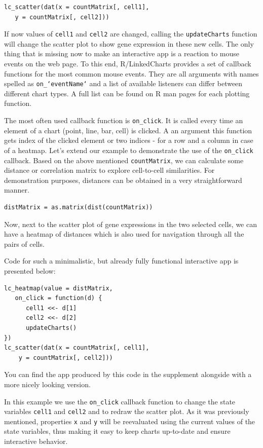 \documentclass[twocolumn,10pt]{article}
\begin{document}
\begin{verbatim}
lc_scatter(dat(x = countMatrix[, cell1], 
   y = countMatrix[, cell2]))
\end{verbatim}

If now values of \texttt{cell1} and \texttt{cell2} are changed, calling the \texttt{updateCharts} function will change the scatter plot to show gene expression in these new cells. The only thing that is missing now to make an interactive app is a reaction to mouse events on the web page. To this end, R/LinkedCharts provides a set of callback functions for the most common mouse events. They are all arguments with names spelled as \texttt{on_`eventName`} and a list of available listeners can differ between different chart types. A full list can be found on R man pages for each plotting function.

The most often used callback function is \texttt{on_click}. It is called every time an element of a chart (point, line, bar, cell) is clicked. A an argument this function gets index of the clicked element or two indices - for a row and a column in case of a heatmap. Let's extend our example to demonstrate the use of the \texttt{on_click} callback. Based on the above mentioned \texttt{countMatrix}, we can calculate some distance or correlation matrix to explore cell-to-cell similarities. For demonstration purposes, distances can be obtained in a very straightforward manner.

\begin{verbatim}
distMatrix = as.matrix(dist(countMatrix))
\end{verbatim}

Now, next to the scatter plot of gene expressions in the two selected cells, we can have a heatmap of distances which is also used for navigation through all the pairs of cells. 

Code for such a minimalistic, but already fully functional interactive app is presented below:

\begin{verbatim}
lc_heatmap(value = distMatrix, 
   on_click = function(d) {
      cell1 <<- d[1]
      cell2 <<- d[2]
      updateCharts()
})
lc_scatter(dat(x = countMatrix[, cell1],
	y = countMatrix[, cell2]))
\end{verbatim}

You can find the app produced by this code in the supplement alongside with a more nicely looking version.

In this example we use the \texttt{on_click} callback function to change the state variables \texttt{cell1} and \texttt{cell2} and to redraw the scatter plot. As it was previously mentioned, properties \texttt{x} and \texttt{y} will be reevaluated using the current values of the state variables, thus making it easy to keep charts up-to-date and ensure interactive behavior.
\end{document}
